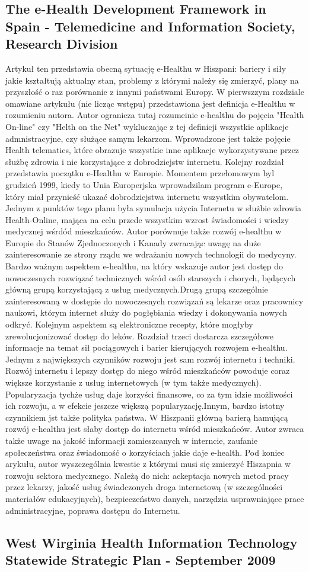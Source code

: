 \documentclass[a4paper,10pt]{article}
\begin{document}
\subsection {The e-Health Development Framework in Spain - Telemedicine and Information Society, Research Division}
Artykuł ten przedstawia obecną sytuację e-Healthu w Hiszpani: bariery i siły jakie kształtują aktualny stan, problemy z którymi należy się zmierzyć, plany na przyszłość o raz porównanie z innymi państwami Europy. W pierwszzym rozdziale omawiane artykułu (nie licząc wstępu) przedstawiona jest definicja e-Healthu w rozumieniu autora. Autor ogranicza tutaj rozumeinie e-healthu do pojęcia "Health On-line" czy "Helth on the Net" wykluczając z tej definicji wszystkie aplikacje admnistracyjne, czy służące samym lekarzom. Wprowadzone jest także pojęcie Health telematics, które obrazuje wszystkie inne aplikacje wykorzystywane przez służbę zdrowia i nie korzystające z dobrodziejstw internetu.
Kolejny rozdział przedstawia początku e-Healthu w Europie. Momentem przełomowym byl grudzień 1999, kiedy to Unia Europerjska wprowadzilam program e-Europe, który miał przynieść ukazać dobrodziejstwa
internetu wszystkim obywatelom. Jednym z punktów tego planu była symulacja użycia Internetu w służbie zdrowia Health-Online, mająca na celu przede wszystkim wzrost świadomości i wiedzy medycznej
wśrdód mieszkańców. Autor porównuje także rozwój e-healthu w Europie do Stanów Zjednoczonych i Kanady zwracając uwagę na duże zainteresowanie ze strony rządu we wdrażaniu nowych technologii do medycyny.
Bardzo ważnym aspektem e-healthu, na który wskazuje autor jest dostęp do nowoczesnych rozwiązać technicznych wśród osób starszych i chorych, będących główną grupą korzystającą z usług medycznych.Drugą grupą
szczególnie zainteresowaną w dostępie do nowoczesnych rozwiązań są lekarze oraz pracownicy naukowi, którym internet służy do pogłębiania wiedzy i dokonywania nowych odkryć. Kolejnym aspektem
są elektroniczne recepty, które mogłyby zrewolucjonizować dostęp do leków.
Rozdział trzeci dostarcza szczegółowe informacje na temat sił pociągowych i barier kierujących rozwojem e-healthu. Jednym z największych czynników rozwoju jest sam rozwój internetu i techniki.
Rozwój internetu i lepszy dostęp do niego wśród mieszkańców powoduje coraz większe korzystanie z usług internetowych (w tym także medycznych). Popularyzacja tychże usług daje korzyści finansowe, 
co za tym idzie możliwości ich rozwoju, a w efekcie jeszcze większą popularyzację.Innym, bardzo istotny czynnikiem jst także polityka państwa. W Hiszpanii główną barierą hamującą rozwój
e-healthu jest słaby dostęp do internetu wśród mieszkańców. Autor zwraca także uwage na jakość informacji zamieszcanych w interncie, zaufanie społeczeństwa oraz świadomość o korzyściach jakie daje
e-health. Pod koniec arykułu, autor wyszczególnia kwestie z którymi musi się zmierzyć Hiszapnia w rozwoju sektora medycznego. Należą do nich: ackeptacja nowych metod pracy przez lekarzy, jakość
usług świadczonych droga internetową (w szczególności materiałów edukacyjnych), bezpieczeństwo danych, narzędzia usprawniające prace administracyjne, poprawa dostępu do Internetu.
\subsection {West Wirginia Health Information Technology Statewide Strategic Plan - September 2009}
\end{document}
